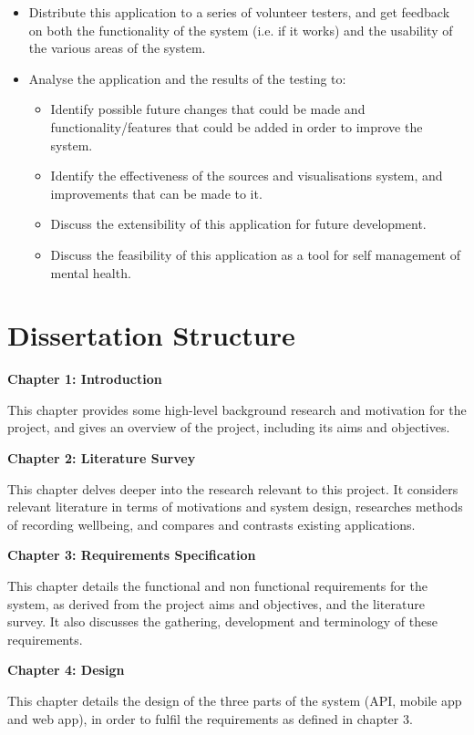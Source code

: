 \documentclass[11pt,openright,a4paper]{report}
\begin{document}
\begin{itemize}
\item Distribute this application to a series of volunteer testers, and get feedback on both the functionality of the system (i.e. if it works) and the usability of the various areas of the system.
\item Analyse the application and the results of the testing to:
\begin{itemize}
  \item Identify possible future changes that could be made and functionality/features that could be added in order to improve the system.
  \item Identify the effectiveness of the sources and visualisations system, and improvements that can be made to it.
  \item Discuss the extensibility of this application for future development.
  \item Discuss the feasibility of this application as a tool for self management of mental health.
\end{itemize}

\end{itemize}

\section{Dissertation Structure}
\textbf{Chapter 1: Introduction}

This chapter provides some high-level background research and motivation for the project, and gives an overview of the project, including its aims and objectives.

\textbf{Chapter 2: Literature Survey}

This chapter delves deeper into the research relevant to this project. It considers relevant literature in terms of motivations and system design, researches methods of recording wellbeing, and compares and contrasts existing applications.

\textbf{Chapter 3: Requirements Specification}

This chapter details the functional and non functional requirements for the system, as derived from the project aims and objectives, and the literature survey. It also discusses the gathering, development and terminology of these requirements.

\textbf{Chapter 4: Design}

This chapter details the design of the three parts of the system (API, mobile app and web app), in order to fulfil the requirements as defined in chapter 3.
\end{document}
